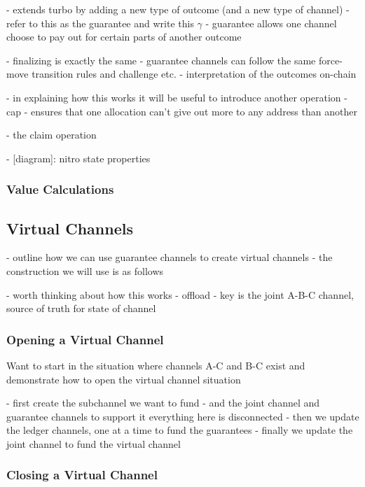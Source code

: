 \documentclass{article}
\theoremstyle{definition}
\begin{document}
- extends turbo by adding a new type of outcome (and a new type of channel)
- refer to this as the guarantee and write this $\gamma$
- guarantee allows one channel choose to pay out for certain parts of another outcome

- finalizing is exactly the same
- guarantee channels can follow the same force-move transition rules and challenge etc.
- interpretation of the outcomes on-chain

- in explaining how this works it will be useful to introduce another operation
- cap - ensures that one allocation can't give out more to any address than another



- the claim operation




- [diagram]: nitro state properties


\subsubsection{Value Calculations}

\subsection{Virtual Channels}

- outline how we can use guarantee channels to create virtual channels
- the construction we will use is as follows



- worth thinking about how this works
- offload
- key is the joint A-B-C channel, source of truth for state of channel


\subsubsection{Opening a Virtual Channel}

Want to start in the situation where channels A-C and B-C exist and demonstrate how to
open the virtual channel situation

- first create the subchannel we want to fund
- and the joint channel and guarantee channels to support it
everything here is disconnected
- then we update the ledger channels, one at a time to fund the guarantees
- finally we update the joint channel to fund the virtual channel

\subsubsection{Closing a Virtual Channel}
\end{document}
